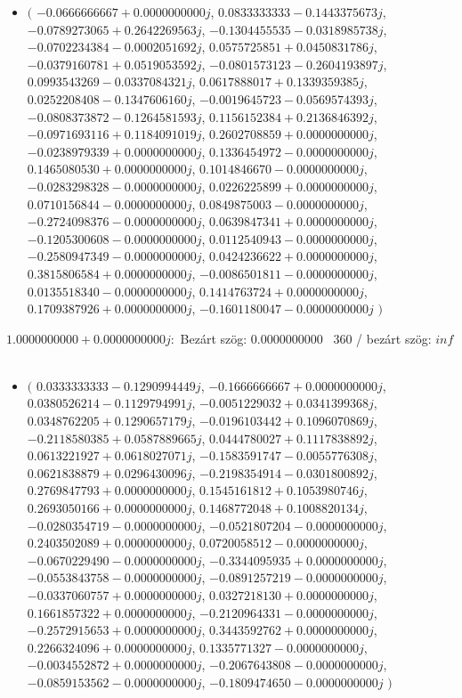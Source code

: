 \documentclass[14pt,a4paper]{article}
\begin{document}
\begin{itemize}
\item
$\big($
$-0.0666666667+0.0000000000j$, $0.0833333333-0.1443375673j$, $-0.0789273065+0.2642269563j$, $-0.1304455535-0.0318985738j$, $-0.0702234384-0.0002051692j$, $0.0575725851+0.0450831786j$, $-0.0379160781+0.0519053592j$, $-0.0801573123-0.2604193897j$, $0.0993543269-0.0337084321j$, $0.0617888017+0.1339359385j$, $0.0252208408-0.1347606160j$, $-0.0019645723-0.0569574393j$, $-0.0808373872-0.1264581593j$, $0.1156152384+0.2136846392j$, $-0.0971693116+0.1184091019j$, $0.2602708859+0.0000000000j$, $-0.0238979339+0.0000000000j$, $0.1336454972-0.0000000000j$, $0.1465080530+0.0000000000j$, $0.1014846670-0.0000000000j$, $-0.0283298328-0.0000000000j$, $0.0226225899+0.0000000000j$, $0.0710156844-0.0000000000j$, $0.0849875003-0.0000000000j$, $-0.2724098376-0.0000000000j$, $0.0639847341+0.0000000000j$, $-0.1205300608-0.0000000000j$, $0.0112540943-0.0000000000j$, $-0.2580947349-0.0000000000j$, $0.0424236622+0.0000000000j$, $0.3815806584+0.0000000000j$, $-0.0086501811-0.0000000000j$, $0.0135518340-0.0000000000j$, $0.1414763724+0.0000000000j$, $0.1709387926+0.0000000000j$, $-0.1601180047-0.0000000000j$
$\big)$
\end{itemize}
$1.0000000000+0.0000000000j$:\
Bezárt szög: $0.0000000000$ \
360 / bezárt szög: $inf$\
\begin{itemize}
\item
$\big($
$0.0333333333-0.1290994449j$, $-0.1666666667+0.0000000000j$, $0.0380526214-0.1129794991j$, $-0.0051229032+0.0341399368j$, $0.0348762205+0.1290657179j$, $-0.0196103442+0.1096070869j$, $-0.2118580385+0.0587889665j$, $0.0444780027+0.1117838892j$, $0.0613221927+0.0618027071j$, $-0.1583591747-0.0055776308j$, $0.0621838879+0.0296430096j$, $-0.2198354914-0.0301800892j$, $0.2769847793+0.0000000000j$, $0.1545161812+0.1053980746j$, $0.2693050166+0.0000000000j$, $0.1468772048+0.1008820134j$, $-0.0280354719-0.0000000000j$, $-0.0521807204-0.0000000000j$, $0.2403502089+0.0000000000j$, $0.0720058512-0.0000000000j$, $-0.0670229490-0.0000000000j$, $-0.3344095935+0.0000000000j$, $-0.0553843758-0.0000000000j$, $-0.0891257219-0.0000000000j$, $-0.0337060757+0.0000000000j$, $0.0327218130+0.0000000000j$, $0.1661857322+0.0000000000j$, $-0.2120964331-0.0000000000j$, $-0.2572915653+0.0000000000j$, $0.3443592762+0.0000000000j$, $0.2266324096+0.0000000000j$, $0.1335771327-0.0000000000j$, $-0.0034552872+0.0000000000j$, $-0.2067643808-0.0000000000j$, $-0.0859153562-0.0000000000j$, $-0.1809474650-0.0000000000j$
$\big)$
\end{itemize}
\end{document}
